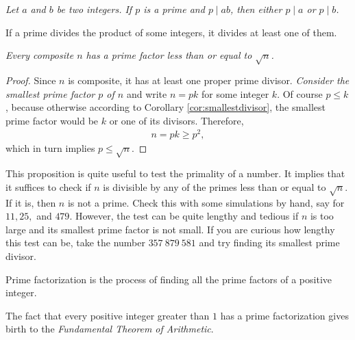 \documentclass{subfile}
\begin{document}
	\begin{proposition}\slshape\label{prop:euclidslemma}
		Let $a$ and $b$ be two integers. If $p$ is a prime and $p\mid ab$, then either $p\mid a$ or $p\mid b$.
	\end{proposition}

	\begin{corollary}\label{cor:euclidgeneral}
		If a prime divides the product of some integers, it divides at least one of them.
	\end{corollary}

	\begin{proposition}\slshape\label{factorsqrt}
		Every composite $n$ has a prime factor less than or equal to $\sqrt{n}$.
	\end{proposition}

	\begin{proof}
		Since $n$ is composite, it has at least one proper prime divisor. {\it Consider the smallest prime factor $p$ of $n$} and write $n=pk$ for some integer $k$. Of course $p\leq k$, because otherwise according to Corollary \eqref{cor:smallestdivisor}, the smallest prime factor would be $k$ or one of its divisors. Therefore,
		\begin{align*}
			n=pk\geq p^2,
		\end{align*}
		which in turn implies $p\leq \sqrt{n}$.
	\end{proof}

	This proposition is quite useful to test the primality of a number. It implies that it suffices to check if $n$ is divisible by any of the primes less than or equal to $\sqrt{n}$. If it is, then $n$ is not a prime. Check this with some simulations by hand, say for $11,25,$ and $479$. However, the test can be quite lengthy and tedious if $n$ is too large and its smallest prime factor is not small. If you are curious how lengthy this test can be, take the number $357 \ 879 \ 581$ and try finding its smallest prime divisor.

	\begin{definition}
		Prime factorization is the process of finding all the prime factors of a positive integer.
	\end{definition}

	The fact that every positive integer greater than $1$ has a prime factorization gives birth to the \textit{Fundamental Theorem of Arithmetic}.
\end{document}
